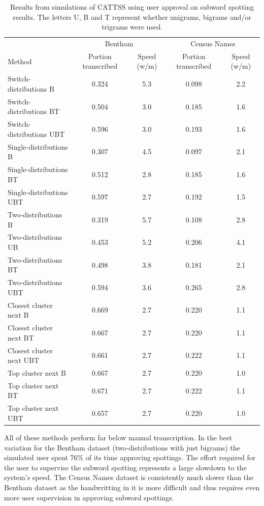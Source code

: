 \documentclass[ms,electronic,twosidetoc,letterpaper,chaptercenter,parttop,lol,lof,lot]{byumsphd}
\begin{document}
\begin{table}
\centering
\begin{tabular}{| l | c  c | c c |}
  \hline
   & \multicolumn{2}{c|}{Bentham} & \multicolumn{2}{c|}{Census Names}\\
  Method & Portion transcribed & Speed (w/m) & Portion transcribed & Speed (w/m)\\
  \hline
  Switch-distributions B & 0.324 & 5.3 &  0.098 & 2.2 \\
  Switch-distributions BT & 0.504 & 3.0 &  0.185 & 1.6 \\
  Switch-distributions UBT & 0.596 & 3.0 & 0.193 & 1.6 \\
  Single-distributions B & 0.307 & 4.5 & 0.097 & 2.1 \\
  Single-distributions BT & 0.512 & 2.8 & 0.185 & 1.6 \\
  Single-distributions UBT & 0.597 & 2.7 & 0.192 & 1.5 \\
  Two-distributions B & 0.319 & 5.7 & 0.108 & 2.8 \\
  Two-distributions UB & 0.453 & 5.2 & 0.206 & 4.1 \\
  Two-distributions BT & 0.498 & 3.8 & 0.181 & 2.1 \\
  Two-distributions UBT & 0.594 & 3.6 & 0.265 & 2.8 \\
  Closest cluster next B & 0.669 & 2.7 & 0.220 & 1.1 \\
  Closest cluster next BT & 0.667& 2.7 & 0.220 & 1.1 \\
  Closest cluster next UBT & 0.661 & 2.7 & 0.222 & 1.1 \\
  Top cluster next B & 0.667 & 2.7 & 0.220 & 1.0 \\
  Top cluster next BT & 0.671 & 2.7 & 0.222 & 1.1 \\
  Top cluster next UBT & 0.657 & 2.7 & 0.220 & 1.0 \\
  \hline  
\end{tabular}
\caption{Results from simulations of CATTSS using user approval on subword spotting results. The letters U, B and T represent whether unigrams, bigrams and/or trigrams were used.}
\label{tab:appresults}
\end{table}

All of these methods perform far below manual transcription. In the best variation for the Bentham dataset (two-distributions with just bigrams) the simulated user spent 76\% of its time approving spottings. The effort required for the user to supervise the subword spotting represents a large slowdown to the system's speed. The Census Names dataset is consistently much slower than the Bentham dataset as the handwritting in it is more difficult and thus requires even more user supervision in approving subword spottings.
\end{document}

